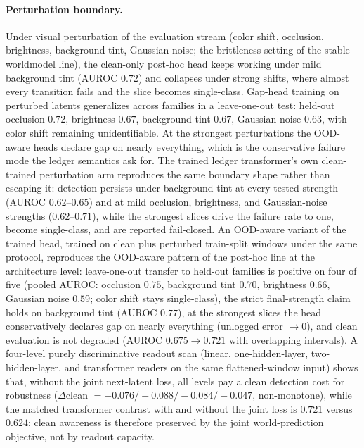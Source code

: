 \paragraph{Perturbation boundary.}
Under visual perturbation of the evaluation stream (color shift, occlusion,
brightness, background tint, Gaussian noise; the brittleness setting of the
stable-worldmodel line), the clean-only post-hoc head keeps working under
mild background tint (AUROC $0.72$) and collapses under strong shifts, where
almost every transition fails and the slice becomes single-class.  Gap-head
training on perturbed latents generalizes across families in a leave-one-out
test: held-out occlusion $0.72$, brightness $0.67$, background tint $0.67$,
Gaussian noise $0.63$, with color shift remaining unidentifiable.  At the
strongest perturbations the OOD-aware heads declare gap on nearly everything,
which is the conservative failure mode the ledger semantics ask for.  The
trained ledger transformer's own clean-trained perturbation arm reproduces
the same boundary shape rather than escaping it: detection persists under
background tint at every tested strength (AUROC $0.62$--$0.65$) and at mild
occlusion, brightness, and Gaussian-noise strengths ($0.62$--$0.71$), while
the strongest slices drive the failure rate to one, become single-class, and
are reported fail-closed.  An OOD-aware variant of the trained head, trained
on clean plus perturbed train-split windows under the same protocol,
reproduces the OOD-aware pattern of the post-hoc line at the architecture
level: leave-one-out transfer to held-out families is positive on four of
five (pooled AUROC: occlusion $0.75$, background tint $0.70$, brightness
$0.66$, Gaussian noise $0.59$; color shift stays single-class), the strict
final-strength claim holds on background tint (AUROC $0.77$), at the
strongest slices the head conservatively declares gap on nearly everything
(unlogged error $\rightarrow 0$), and clean evaluation is not degraded
(AUROC $0.675 \rightarrow 0.721$ with overlapping intervals).  A four-level
purely discriminative readout scan (linear, one-hidden-layer, two-hidden-layer,
and transformer readers on the same flattened-window input) shows that, without
the joint next-latent loss, all levels pay a clean detection cost for robustness
($\Delta$clean $=-0.076/-0.088/-0.084/-0.047$, non-monotone), while the matched
transformer contrast with and without the joint loss is $0.721$ versus $0.624$;
clean awareness is therefore preserved by the joint world-prediction objective,
not by readout capacity.

